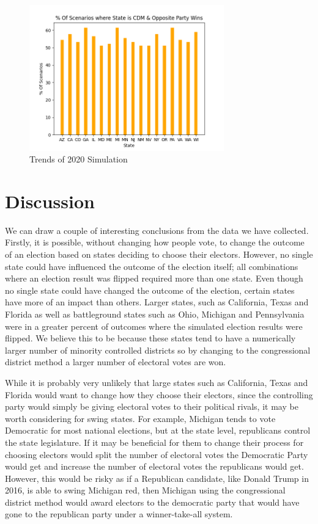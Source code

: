\documentclass{article}
\begin{document}
\begin{figure}
\centering
\includegraphics[width=0.75\textwidth]{trend-2020.png}
\caption{\label{fig:t2020}Trends of 2020 Simulation}
\end{figure}

\section{Discussion}
We can draw a couple of interesting conclusions from the data we have collected. Firstly, it is possible, without changing how people vote, to change the outcome of an election based on states deciding to choose their electors. However, no single state could have influenced the outcome of the election itself; all combinations where an election result was flipped required more than one state. Even though no single state could have changed the outcome of the election, certain states have more of an impact than others. Larger states, such as California, Texas and Florida as well as battleground states such as Ohio, Michigan and Pennsylvania were in a greater percent of outcomes where the simulated election results were flipped. We believe this to be because these states tend to have a numerically larger number of minority controlled districts so by changing to the congressional district method a larger number of electoral votes are won.

While it is probably very unlikely that large states such as California, Texas and Florida would want to change how they choose their electors, since the controlling party would simply be giving electoral votes to their political rivals, it may be worth considering for swing states. For example, Michigan tends to vote Democratic for most national elections, but at the state level, republicans control the state legislature. If it may be beneficial for them to change their process for choosing electors would split the number of electoral votes the Democratic Party would get and increase the number of electoral votes the republicans would get. However, this would be risky as if a Republican candidate, like Donald Trump in 2016, is able to swing Michigan red, then Michigan using the congressional district method would award electors to the democratic party that would have gone to the republican party under a winner-take-all system.
\end{document}
